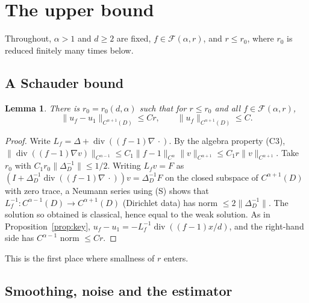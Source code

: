 \documentclass[11pt]{article}
\newtheorem{lemma}[theorem]{Lemma}
\theoremstyle{definition}
\theoremstyle{remark}
\newcommand{\Fc}{\mathcal F}
\newcommand{\dv}{\operatorname{div}}
\begin{document}
\section{The upper bound}\label{sec:upper}

Throughout, $\alpha>1$ and $d\ge2$ are fixed, $f\in\Fc(\alpha,r)$, and $r\le r_0$, where $r_0$ is reduced finitely many times below.

\subsection{A Schauder bound}

\begin{lemma}\label{lem:C4}
There is $r_0=r_0(d,\alpha)$ such that for $r\le r_0$ and all $f\in\Fc(\alpha,r)$,
\begin{equation}\label{eq:C4}
\|u_f-u_1\|_{C^{\alpha+1}(D)}\le Cr,\qquad\|u_f\|_{C^{\alpha+1}(D)}\le C .
\end{equation}
\end{lemma}

\begin{proof}
Write $L_f=\Delta+\dv((f-1)\nabla\,\cdot)$. By the algebra property (C3),
$\|\dv((f-1)\nabla v)\|_{C^{\alpha-1}}\le C_1\|f-1\|_{C^\alpha}\|v\|_{C^{\alpha+1}}\le C_1r\|v\|_{C^{\alpha+1}}$.
Take $r_0$ with $C_1r_0\|\Delta_D^{-1}\|\le1/2$. Writing $L_fv=F$ as $(I+\Delta_D^{-1}\dv((f-1)\nabla\,\cdot))v=\Delta_D^{-1}F$ on the closed subspace of $C^{\alpha+1}(D)$ with zero trace, a Neumann series using (S) shows that $L_f^{-1}:C^{\alpha-1}(D)\to C^{\alpha+1}(D)$ (Dirichlet data) has norm $\le2\|\Delta_D^{-1}\|$. The solution so obtained is classical, hence equal to the weak solution. As in Proposition~\ref{prop:key}, $u_f-u_1=-L_f^{-1}\dv((f-1)x/d)$, and the right-hand side has $C^{\alpha-1}$ norm $\le Cr$.
\end{proof}

This is the first place where smallness of $r$ enters.

\subsection{Smoothing, noise and the estimator}
\end{document}

